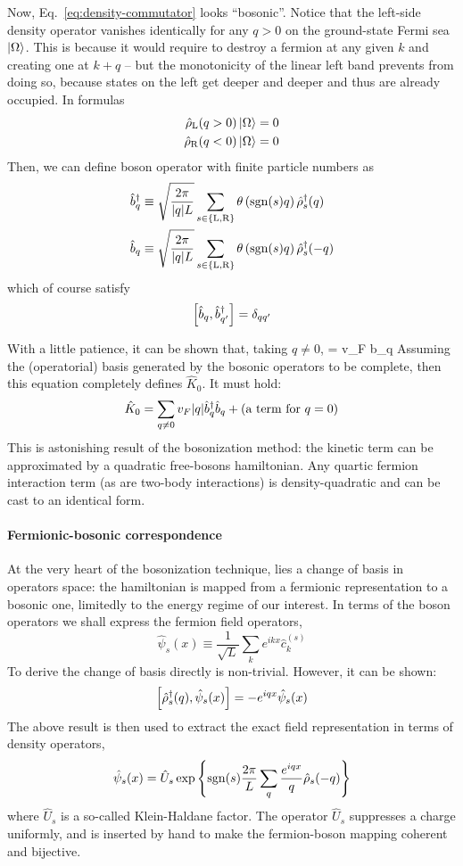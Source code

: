 Now, Eq.~\eqref{eq:density-commutator} looks ``bosonic''. Notice that the left-side density operator vanishes identically for any $q>0$ on the ground-state Fermi sea $\ket{\Omega}$. This is because it would require to destroy a fermion at any given $k$ and creating one at $k+q$ -- but the monotonicity of the linear left band prevents from doing so, because states on the left get deeper and deeper and thus are already occupied. In formulas
\[
\begin{aligned}
	\hat \rho_\mathrm{L} (q>0) \ket{\Omega} &= 0 \\
	\hat \rho_\mathrm{R} (q<0) \ket{\Omega} &= 0
\end{aligned}
\]
Then, we can define boson operator with finite particle numbers as
\[
\begin{aligned}
	\hat b_q^\dagger &\equiv \sqrt{\frac{2\pi}{\abs{q}L}} \sum_{s \in \left\{\mathrm L, \mathrm R\right\}} \theta \left(\mathrm{sgn}(s) q\right) \hat \rho_s^\dagger (q) \\
	\hat b_q &\equiv \sqrt{\frac{2\pi}{\abs{q}L}} \sum_{s \in \left\{\mathrm L, \mathrm R\right\}} \theta \left(\mathrm{sgn}(s) q\right) \hat \rho_s^\dagger (-q)
\end{aligned}
\]
which of course satisfy
\[
	\comm{\hat b_q}{\hat b_{q'}^\dagger} = \delta_{qq'}
\]

With a little patience, it can be shown that, taking $q \neq 0$,
\beq\label{eq:boson-hamiltonian-commutator}
	 = v_F  \hat b_q
\eeq
Assuming the (operatorial) basis generated by the bosonic operators to be complete, then this equation completely defines $\hat K_0$. It must hold:
\[
	\hat K_0 = \sum_{q \neq 0} v_F \abs{q} \hat b_q^\dagger \hat b_q + (\text{a term for $q=0$})
\]
This is astonishing result of the bosonization method: the kinetic term can be approximated by a quadratic free-bosons hamiltonian. Any quartic fermion interaction term (as are two-body interactions) is density-quadratic and can be cast to an identical form.

\paragraph{Fermionic-bosonic correspondence}
At the very heart of the bosonization technique, lies a change of basis in operators space: the hamiltonian is mapped from a fermionic representation to a bosonic one, limitedly to the energy regime of our interest. In terms of the boson operators we shall express the fermion field operators,
\[
	\hat \psi_s (x) \equiv \frac{1}{\sqrt{L}} \sum_k e^{ikx} \hat c_k^{(s)}
\]
To derive the change of basis directly is non-trivial. However, it can be shown:
\[
	\comm{\hat \rho_s^\dagger (q)}{\hat \psi_s (x)} = -e^{iqx} \hat \psi_s (x)
\]
The above result is then used to extract the exact field representation in terms of density operators,
\[
	\hat \psi_s (x) = \hat U_s \exp\left\{ \mathrm{sgn}(s) \frac{2\pi}{L} \sum_q \frac{e^{iqx}}{q} \hat \rho_s (-q) \right\}
\]
where $\hat U_s$ is a so-called Klein-Haldane factor. The operator $\hat U_s$ suppresses a charge uniformly, and is inserted by hand to make the fermion-boson mapping coherent and bijective.

